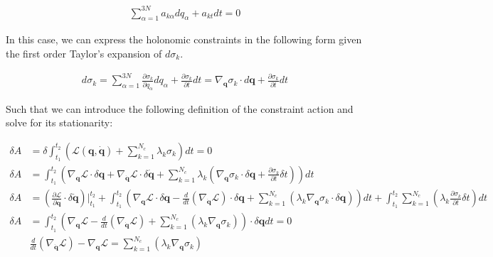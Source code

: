 \documentclass[draft]{agujournal2019}
\begin{document}
\begin{definition}
\begin{align*}
    \sum_{\alpha = 1}^{3N} a_{k\alpha} dq_\alpha + a_{kt}dt = 0
\end{align*}

In this case, we can express the holonomic constraints in the following form given the first order Taylor's expansion of $d\sigma_k$.

\begin{align*}
    d\sigma_k = \sum_{\alpha = 1}^{3N} \frac{\partial \sigma_k}{\partial q_\alpha} dq_\alpha + \frac{\partial \sigma_k}{\partial t} dt = \nabla_{\mathbf{q}} \sigma_k \cdot d\mathbf{q} + \frac{\partial \sigma_k}{\partial t} dt
\end{align*}

Such that we can introduce the following definition of the constraint action and solve for its stationarity:

\begin{align*}
    \delta A &= \delta \int_{t_1}^{t_2} \left( \mathcal{L}(\mathbf{q}, \dot{\mathbf{q}}) + \sum_{k = 1}^{N_c} \lambda_k \sigma_k\right)dt = 0 \\
    \delta A &= \int_{t_1}^{t_2} \left(\nabla_{\mathbf{q}} \mathcal{L} \cdot \delta \mathbf{q} + \nabla_{\dot{\mathbf{q}}} \mathcal{L} \cdot \delta \dot{\mathbf{q}} + \sum_{k = 1}^{N_c} \lambda_k \left( \nabla_{\mathbf{q}} \sigma_k \cdot \delta \mathbf{q} + \frac{\partial \sigma_k}{\partial t} \delta t\right)\right) dt \\
    \delta A &= \left(\frac{\partial \mathcal{L}}{\partial \dot{\mathbf{q}}} \cdot \delta \dot{\mathbf{q}} \right)\Big\vert_{t_1}^{t_2} + \int_{t_1}^{t_2} \left( \nabla_\mathbf{q} \mathcal{L} \cdot \delta \mathbf{q} - \frac{d}{dt}\left( \nabla_{\dot{\mathbf{q}}} \mathcal{L}\right) \cdot \delta \mathbf{q} + \sum_{k = 1}^{N_c} \left( \lambda_k \nabla_{\mathbf{q}} \sigma_k \cdot \delta \mathbf{q}\right)\right) dt + \int_{t_1}^{t_2} \sum_{k = 1}^{N_c} \left( \lambda_k \frac{\partial \sigma_k}{\partial t} \delta t \right) dt \\
    \delta A &= \int_{t_1}^{t_2} \left( \nabla_\mathbf{q} \mathcal{L} - \frac{d}{dt}\left( \nabla_{\dot{\mathbf{q}}} \mathcal{L}\right) + \sum_{k = 1}^{N_c} \left( \lambda_k \nabla_{\mathbf{q}} \sigma_k \right)\right) \cdot \delta \mathbf{q} dt = 0 \\
    &\frac{d}{dt}\left( \nabla_{\dot{\mathbf{q}}} \mathcal{L}\right) - \nabla_\mathbf{q} \mathcal{L} = \sum_{k = 1}^{N_c} \left( \lambda_k \nabla_{\mathbf{q}} \sigma_k \right)
\end{align*}


\end{definition}
\end{document}
